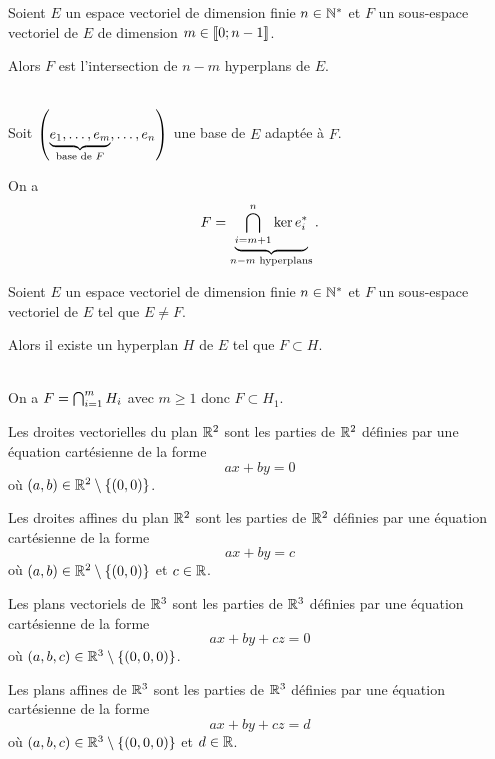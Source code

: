 \begin{prop}
Soient \(E\) un espace vectoriel de dimension finie \(n\in\mathbb{N}^*\) et \(F\) un sous-espace vectoriel de \(E\) de dimension \(m\in\left\llbracket0;n-1\right\rrbracket\).

Alors \(F\) est l'intersection de \(n-m\) hyperplans de \(E\).
\end{prop}

\begin{dem}~\\
Soit \(\left(\underbrace{e_1,\dots,e_m}_{\text{base de }F},\dots,e_n\right)\) une base de \(E\) adaptée à \(F\).

On a \[F=\underbrace{\bigcap_{i=m+1}^n\ker e_i^{*}}_{n-m\text{ hyperplans}}.\]
\end{dem}

\begin{cor}
Soient \(E\) un espace vectoriel de dimension finie \(n\in\mathbb{N}^*\) et \(F\) un sous-espace vectoriel de \(E\) tel que \(E\not=F\).

Alors il existe un hyperplan \(H\) de \(E\) tel que \(F\subset H\).
\end{cor}

\begin{dem}~\\
On a \(F=\bigcap_{i=1}^mH_i\) avec \(m\geq1\) donc \(F\subset H_1\).
\end{dem}

\begin{ex}
Les droites vectorielles du plan \(\mathbb{R}^2\) sont les parties de \(\mathbb{R}^2\) définies par une équation cartésienne de la forme \[ax+by=0\] où \(\left(a,b\right)\in\mathbb{R}^2\setminus\left\lbrace\left(0,0\right)\right\rbrace\).
\end{ex}

\begin{ex}
Les droites affines du plan \(\mathbb{R}^2\) sont les parties de \(\mathbb{R}^2\) définies par une équation cartésienne de la forme \[ax+by=c\] où \(\left(a,b\right)\in\mathbb{R}^2\setminus\left\lbrace\left(0,0\right)\right\rbrace\) et \(c\in\mathbb{R}\).
\end{ex}

\begin{ex}
Les plans vectoriels de \(\mathbb{R}^3\) sont les parties de \(\mathbb{R}^3\) définies par une équation cartésienne de la forme \[ax+by+cz=0\] où \(\left(a,b,c\right)\in\mathbb{R}^3\setminus\left\lbrace\left(0,0,0\right)\right\rbrace\).
\end{ex}

\begin{ex}
Les plans affines de \(\mathbb{R}^3\) sont les parties de \(\mathbb{R}^3\) définies par une équation cartésienne de la forme \[ax+by+cz=d\] où \(\left(a,b,c\right)\in\mathbb{R}^3\setminus\left\lbrace\left(0,0,0\right)\right\rbrace\) et \(d\in\mathbb{R}\).
\end{ex}

